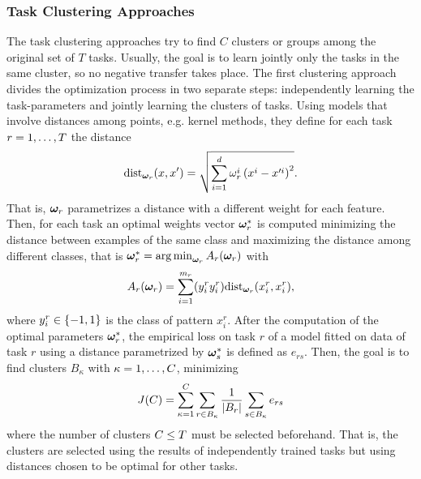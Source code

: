 \subsubsection{Task Clustering Approaches}
The task clustering approaches try to find $C$ clusters or groups among the original set of $T$ tasks. Usually, the goal is to learn jointly only the tasks in the same cluster, so no negative transfer takes place.
The first clustering approach~\citep{ThrunO96} divides the optimization process in two separate steps: independently learning the task-parameters and jointly learning the clusters of tasks.
Using models that involve distances among points, e.g. kernel methods, they define for each task $r=1, \ldots, T$ the distance
$$ \text{dist}_{\bm{\omega}_r}(x, x') = \sqrt{\sum_{i=1}^d \omega_r^i \left( x^i - x'^i \right)^2}. $$
That is, $\bm{\omega}_r$ parametrizes a distance with a different weight for each feature.
Then, for each task an optimal weights vector $\bm{\omega}_r^*$ is computed minimizing the distance between examples of the same class and maximizing the distance among different classes, that is ${\bm{\omega}}^*_r = \operatorname*{arg\min}_{\bm{\omega}_r} A_r(\bm{\omega}_r)$ with
\begin{equation}
    \nonumber
    A_r(\bm{\omega}_r) = \sum_{i=1}^{m_r} (y_i^r  y_i^r)  \text{dist}_{\bm{\omega}_r}(x_i^r, x_i^r),
\end{equation}
where $y_i^r \in \left\{-1, 1\right\}$ is the class of pattern $x_i^r$.
After the computation of the optimal parameters $\bm{\omega}_r^*$, the empirical loss on task $r$ of a model fitted on data of task $r$ using a distance parametrized by $\bm{\omega}_s^*$ is defined as $e_{rs}$. Then, the goal is to find clusters $B_\kappa$ with $\kappa=1, \ldots, C$, minimizing
\begin{equation}
    \nonumber
    J(C) = \sum_{\kappa = 1}^C \sum_{r \in B_\kappa} \frac{1}{\left|B_r\right|} \sum_{s \in B_\kappa} e_{rs} 
\end{equation}
where the number of clusters $C \leq T$ must be selected beforehand. That is, the clusters are selected using the results of independently trained tasks but using distances chosen to be optimal for other tasks.
